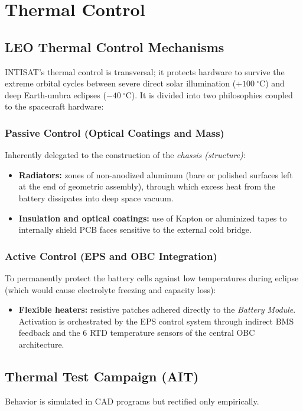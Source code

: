 \chapter{Thermal Control}

\section{LEO Thermal Control Mechanisms}
INTISAT's thermal control is transversal; it protects hardware to survive the extreme orbital cycles between severe direct solar illumination ($+100\ ^\circ$C) and deep Earth-umbra eclipses ($-40\ ^\circ$C). It is divided into two philosophies coupled to the spacecraft hardware:

\subsection{Passive Control (Optical Coatings and Mass)}
Inherently delegated to the construction of the \textit{chassis (structure)}:
\begin{itemize}
    \item \textbf{Radiators:} zones of non-anodized aluminum (bare or polished surfaces left at the end of geometric assembly), through which excess heat from the battery dissipates into deep space vacuum.
    \item \textbf{Insulation and optical coatings:} use of Kapton or aluminized tapes to internally shield PCB faces sensitive to the external cold bridge.
\end{itemize}

\subsection{Active Control (EPS and OBC Integration)}
To permanently protect the battery cells against low temperatures during eclipse (which would cause electrolyte freezing and capacity loss):
\begin{itemize}
    \item \textbf{Flexible heaters:} resistive patches adhered directly to the \textit{Battery Module}. Activation is orchestrated by the EPS control system through indirect BMS feedback and the 6 RTD temperature sensors of the central OBC architecture.
\end{itemize}

\section{Thermal Test Campaign (AIT)}
Behavior is simulated in CAD programs but rectified only empirically.

